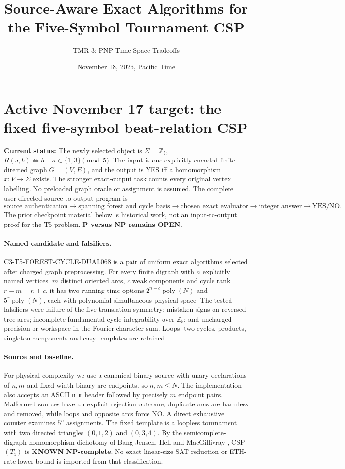 \documentclass[11pt]{article}
\title{Source-Aware Exact Algorithms for the Five-Symbol Tournament CSP}
\author{TMR-3: PNP Time-Space Tradeoffs}
\date{November 18, 2026, Pacific Time}
\begin{document}
\maketitle

\section{Active November 17 target: the fixed five-symbol beat-relation CSP}
\noindent\textbf{Current status:} The newly selected object is
$\Sigma=\mathbb Z_5$, $R(a,b)\Longleftrightarrow
b-a\in\{1,3\}\pmod 5$. The input is one explicitly encoded finite directed
graph $G=(V,E)$, and the output is YES iff a homomorphism
$x:V\to\Sigma$ exists. The stronger exact-output task counts every
original vertex labelling. No preloaded graph oracle or assignment is
assumed. The complete user-directed source-to-output program is
\[
\text{source authentication}\to
\text{spanning forest and cycle basis}\to
\text{chosen exact evaluator}\to
\text{integer answer}\to\text{YES/NO}.
\]
The prior checkpoint material below is historical work, not an
input-to-output proof for the T5 problem. \textbf{P versus NP remains OPEN.}

\paragraph{Named candidate and falsifiers.}
\textsf{C3-T5-FOREST-CYCLE-DUAL068} is a pair of uniform exact
algorithms selected after charged graph preprocessing. For every
finite digraph with $n$ explicitly named vertices, $m$ distinct
oriented arcs, $c$ weak components and cycle rank $r=m-n+c$, it
has two running-time options $2^{n-c}\operatorname{poly}(N)$ and
$5^r\operatorname{poly}(N)$, each with polynomial simultaneous physical
space. The tested falsifiers were failure of the five-translation
symmetry; mistaken signs on reversed tree arcs; incomplete
fundamental-cycle integrability over $\mathbb Z_5$; and uncharged
precision or workspace in the Fourier character sum. Loops, two-cycles,
products, singleton components and easy templates are retained.

\paragraph{Source and baseline.}
For physical complexity we use a canonical binary source with
unary declarations of $n,m$ and fixed-width binary arc endpoints,
so $n,m\le N$. The implementation also accepts an ASCII
\texttt{n m} header followed by precisely $m$ endpoint pairs.
Malformed sources have an explicit rejection outcome; duplicate arcs
are harmless and removed, while loops and opposite arcs force NO.
A direct exhaustive counter examines $5^n$ assignments.
The fixed template is a loopless tournament with two directed
triangles $(0,1,2)$ and $(0,3,4)$. By the semicomplete-digraph
homomorphism dichotomy of Bang-Jensen, Hell and MacGillivray
\cite{BangJensenHellMacGillivray1988}, \textsc{CSP}$(T_5)$ is
\textbf{KNOWN NP-complete}. No exact linear-size SAT reduction or
ETH-rate lower bound is imported from that classification.
\end{document}
